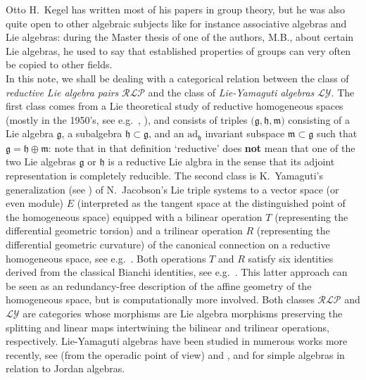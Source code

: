 \documentclass [11pt] {article}
\theoremstyle{definition}
\begin{document}
Otto H.~Kegel has written most of his
papers in group theory, but he was also quite open to other algebraic subjects 
like for instance associative algebras and Lie algebras: during the Master thesis of one of the authors, M.B., about certain Lie algebras, he used to say that established properties of groups can very often be copied to other fields.\\
 In this note, we shall be dealing with a categorical relation between the class of \textit{reductive Lie algebra pairs} $\mathcal{RLP}$ and the class of \textit{Lie-Yamaguti algebras} $\mathcal{LY}$. The first class comes from a Lie 
theoretical study of reductive homogeneous spaces (mostly in the 1950's, see e.g.~\cite{Nom54}, \cite[p.~190]{KN69}), and consists of triples $\big(\mathfrak{g},\mathfrak{h},\mathfrak{m}\big)$ consisting of a Lie algebra
$\mathfrak{g}$, a subalgebra $\mathfrak{h}\subset\mathfrak{g}$, and an 
$\mathrm{ad}_\mathfrak{h}$ invariant subspace $\mathfrak{m}\subset\mathfrak{g}$ such that
 $\mathfrak{g}=\mathfrak{h}\oplus \mathfrak{m}$: note that in that definition `reductive' does \textbf{not}
 mean that one of the two Lie algebras  $\mathfrak{g}$ or $\mathfrak{h}$
 is a reductive Lie algbra in the sense that its adjoint representation is completely reducible.  The second class is  K.~Yamaguti's generalization (see \cite{Yam58}) of N.~Jacobson's Lie triple systems \cite{Jac49} to a vector space (or even module) $E$ (interpreted as the tangent space at the distinguished point of the homogeneous space) equipped with a bilinear operation $T$ (representing the differential geometric torsion) and a trilinear operation $R$ (representing the differential geometric curvature) of the canonical connection on a reductive homogeneous space, see e.g.~\cite[p.~193]{KN69}. Both operations $T$ and $R$ satisfy six identities derived
from the classical Bianchi identities, see e.g.~\cite[p.~135]{KN63}. This latter approach can be seen as an redundancy-free description of the
affine geometry of the homogeneous space, but is computationally more involved.
Both classes $\mathcal{RLP}$ and $\mathcal{LY}$ are categories whose morphisms
are Lie algebra morphisms preserving the splitting and linear maps intertwining
the bilinear and trilinear operations, respectively.
Lie-Yamaguti algebras have been studied in numerous works more recently, see \cite{CD}
(from the operadic point of view) and 
\cite{BEM1}, and \cite{BEM2} for simple algebras in relation to Jordan algebras.
\end{document}
